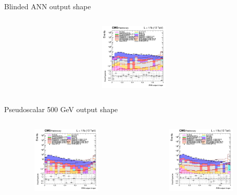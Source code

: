 \documentclass[8pt]{beamer}
\begin{document}
\begin{frame}{Blinded ANN output shape}
\begin{columns}
\begin{column}{0.33\textwidth}
\begin{center}
			\begin{block}{}\end{block}
     			\includegraphics[width=1.0\textwidth, height=90pt]{figs/2018/log_cratio_topCR_ll_var_DNN_signal0_pseudo100.png}
    		\end{center}		
		\end{column}
\end{columns}

\begin{columns}
\begin{column}{1.09\textwidth}
\begin{block}{\centering Pseudoscalar 500 GeV output shape}\end{block}
\end{column}
\end{columns} \vspace{-5pt}
\begin{columns}
		\begin{column}{0.33\textwidth}
			\begin{center}
     			\includegraphics[width=1.0\textwidth, height=90pt]{figs/2016/log_cratio_topCR_ll_var_DNN_signal0_pseudo500.png}
    		\end{center}		
		\end{column}
		\begin{column}{0.33\textwidth}
			\begin{center}
     			\includegraphics[width=1.0\textwidth, height=90pt]{figs/2017/log_cratio_topCR_ll_var_DNN_signal0_pseudo500.png}

\end{center}
\end{column}
\end{columns}
\end{frame}
\end{document}
